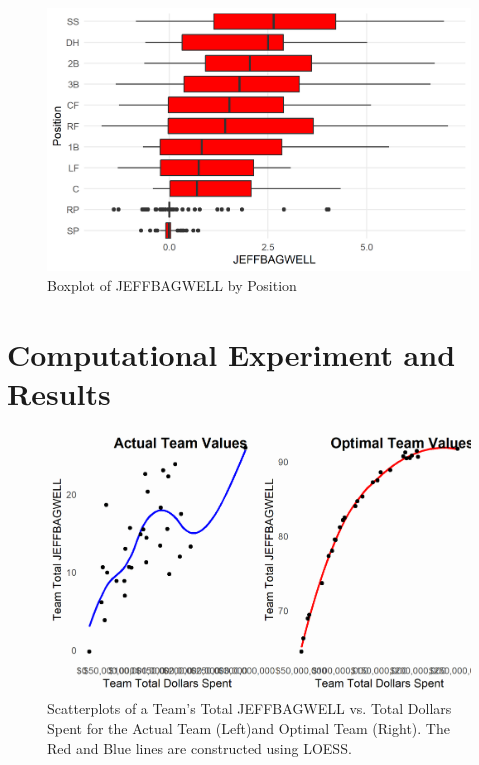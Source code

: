 \documentclass{article}
\begin{document}
\begin{figure}[h]
\caption{Boxplot of JEFFBAGWELL by Position}
\label{fig:salary_war_boxplot}
\centering
\includegraphics[width=0.7\paperwidth, scale=1.25]{war_position_boxplots.png}
\end{figure}

\section{Computational Experiment and Results}

\begin{figure}[h]
\caption{Scatterplots of a Team's Total JEFFBAGWELL vs. Total Dollars Spent for the Actual Team (Left)and Optimal Team (Right). The Red and Blue lines are constructed using LOESS.} 
\label{fig:cowplot}
\centering
\includegraphics[width=0.7\paperwidth, scale=1.25]{bwar_salary_scatter_cowplot.png}
\end{figure}


%
\end{document}
